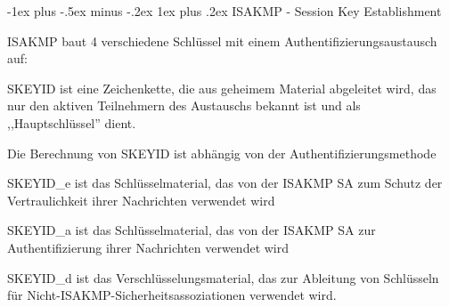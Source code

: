 \documentclass[a4paper]{article}
\makeatletter
\renewcommand{\subsubsection}{\@startsection{subsubsection}{3}{0mm}%
 {-1ex plus -.5ex minus -.2ex}%
 {1ex plus .2ex}%
 {\normalfont\small\bfseries}}
\makeatother
\begin{document}
\begin{multicols}{3}
\begin{itemize*}
            \subsubsection{ISAKMP - Session Key
                  Establishment}
            \begin{itemize*}
                  \item       ISAKMP baut 4 verschiedene Schlüssel mit einem
                  Authentifizierungsaustausch auf:
                  \begin{itemize*}
                        \item SKEYID ist eine Zeichenkette, die aus geheimem Material abgeleitet wird, das nur den aktiven Teilnehmern des Austauschs bekannt ist und als ,,Hauptschlüssel'' dient.
                        \begin{itemize*} \item Die Berechnung von SKEYID ist abhängig von der Authentifizierungsmethode \end{itemize*}
                        \item SKEYID\_e ist das Schlüsselmaterial, das von der ISAKMP SA zum Schutz der Vertraulichkeit ihrer Nachrichten verwendet wird
                        \item SKEYID\_a ist das Schlüsselmaterial, das von der ISAKMP SA zur Authentifizierung ihrer Nachrichten verwendet wird
                        \item SKEYID\_d ist das Verschlüsselungsmaterial, das zur Ableitung von Schlüsseln für Nicht-ISAKMP-Sicherheitsassoziationen verwendet wird.
                  \end{itemize*}
            \end{itemize*}


\end{itemize*}
\end{multicols}
\end{document}
